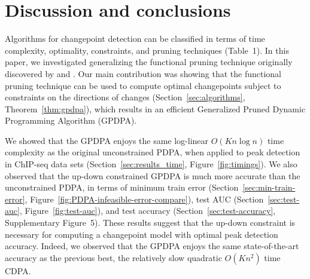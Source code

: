 \documentclass[twoside,11pt]{article}
\begin{document}
%   

\section{Discussion and conclusions}
\label{sec:discussion}

Algorithms for changepoint detection can be classified in terms of
time complexity, optimality, constraints, and pruning techniques
(Table~1). In this paper, we investigated generalizing the functional
pruning technique originally discovered by \citet{pruned-dp} and
\citet{phd-johnson}. Our main contribution was showing that the
functional pruning technique can be used to compute optimal
changepoints subject to constraints on the directions of changes
(Section~\ref{sec:algorithms}, Theorem~\ref{thm:gpdpa}), which results in
an efficient Generalized Pruned Dynamic Programming Algorithm (GPDPA).

We showed that the GPDPA enjoys the same log-linear $O(Kn\log n)$ time
complexity as the original unconstrained PDPA, when applied to peak
detection in ChIP-seq data sets (Section~\ref{sec:results_time},
Figure~\ref{fig:timings}). We also observed that the up-down
constrained GPDPA is much more accurate than the unconstrained PDPA,
in terms of minimum train error (Section~\ref{sec:min-train-error},
Figure~\ref{fig:PDPA-infeasible-error-compare}), test AUC
(Section~\ref{sec:test-auc}, Figure~\ref{fig:test-auc}), and test
accuracy (Section~\ref{sec:test-accuracy}, Supplementary
Figure~5). These results suggest that the up-down constraint is
necessary for computing a changepoint model with optimal peak
detection accuracy. Indeed, we observed that the GPDPA enjoys the same
state-of-the-art accuracy as the previous best, the relatively slow
quadratic $O(Kn^2)$ time CDPA.
\end{document}
